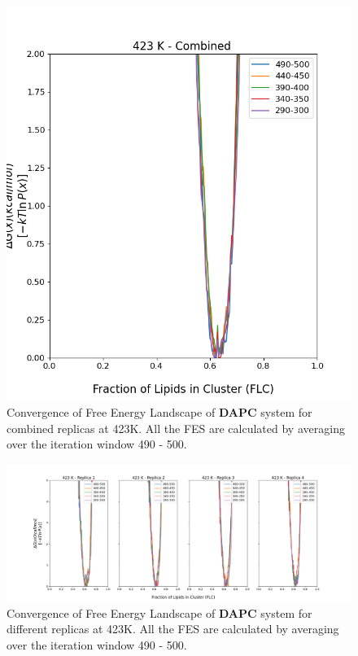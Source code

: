 \documentclass{biophys-new}
\begin{document}
\begin{figure}[hbt!]
\centering
\includegraphics[width=0.6\linewidth]{all_plots/ClusterLipids2Total/DPPC_DAPC_CHOL/423K/Convergence_DAPC_MULTI__423_ClusterLipids2Total.png}
\caption{Convergence of Free Energy Landscape of \textbf{DAPC} system for combined replicas at 423K. All the FES are calculated by averaging over the iteration window 490 - 500.}
\label{fig:view}

\end{figure}

\begin{figure}[hbt!]
\centering
\includegraphics[width=1.1\linewidth]{all_plots/ClusterLipids2Total/DPPC_DAPC_CHOL/423K/Convergence_DAPC_423_ClusterLipids2Total.png}
\caption{Convergence of Free Energy Landscape of \textbf{DAPC} system for different replicas at 423K. All the FES are calculated by averaging over the iteration window 490 - 500.}
\label{fig:view}

\end{figure}
\end{document}
